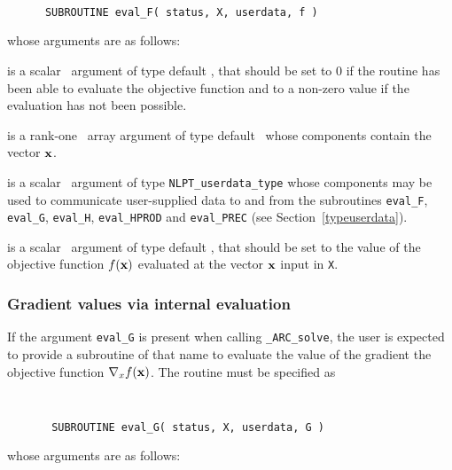 \documentclass{galahad}
\newcommand{\packagename}{ARC}
\newcommand{\fullpackagename}{\libraryname\_\packagename}
\newcommand{\solver}{{\tt \fullpackagename\_solve}}
\begin{document}
\def\baselinestretch{0.8}
{\tt
\begin{verbatim}
      SUBROUTINE eval_F( status, X, userdata, f )
\end{verbatim}
}
\def\baselinestretch{1.0}
\noindent whose arguments are as follows:

\begin{description}
 is a scalar \intentout\ argument of type default \integer,
that should be set to 0 if the routine has been able to evaluate
the objective function
and to a non-zero value if the evaluation has not been possible.

 is a rank-one \intentin\ array argument of type default \realdp\
whose components contain the vector ${\mathbf{x}}$.

 is a scalar \intentinout\ argument of type
{\tt NLPT\_userdata\_type} whose components may be used
to communicate user-supplied data to and from the
subroutines {\tt eval\_F}, {\tt eval\_G},
{\tt eval\_H}, {\tt eval\_HPROD} and {\tt eval\_PREC}
(see Section~\ref{typeuserdata}).

 is a scalar \intentout\ argument of type default \realdp,
that should be set to the value of the objective function $f({\mathbf{x}})$
evaluated at the vector ${\mathbf{x}}$ input in {\tt X}.

\end{description}


\subsubsection{Gradient values via internal evaluation\label{gfv}}

If the argument {\tt eval\_G} is present when calling \solver, the
user is expected to provide a subroutine of that name to evaluate the
value of the gradient the objective function $\nabla_x f({\mathbf{x}})$.
The routine must be specified as

\def\baselinestretch{0.8}
{\tt
\begin{verbatim}
       SUBROUTINE eval_G( status, X, userdata, G )
\end{verbatim} }
\def\baselinestretch{1.0}
\noindent whose arguments are as follows:
\end{document}
